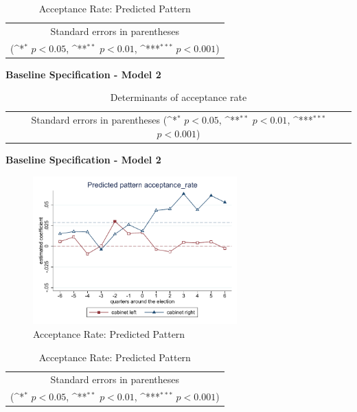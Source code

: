 \documentclass[10pt,a4paper]{scrartcl}
\begin{document}
\begin{table}[!ht]\centering
\renewcommand{\arraystretch}{1.25}
\def\sym#1{\ifmmode^{#1}\else\(^{#1}\)\fi}
\caption{Acceptance Rate: Predicted Pattern}
\begin{tabular}[]{l*{2}{c}}
	\hline\hline
	
	\hline\hline
	\multicolumn{3}{c}{\footnotesize Standard errors in parentheses} \\
	\multicolumn{3}{c}{\footnotesize (\sym{*} \(p<0.05\), \sym{**} \(p<0.01\), \sym{***} \(p<0.001\))}\\
\end{tabular}
\end{table}

\clearpage
\textbf{Baseline Specification - Model 2}
\begin{table}[!ht]\centering
	\scriptsize
	\renewcommand{\arraystretch}{1.05}
	\def\sym#1{\ifmmode^{#1}\else\(^{#1}\)\fi}
	\caption{Determinants of acceptance rate}
	\begin{tabular}{l*{3}{c}}
		\hline\hline
		
		\hline\hline
		\multicolumn{4}{c}{\footnotesize Standard errors in parentheses (\sym{*} \(p<0.05\), \sym{**} \(p<0.01\), \sym{***} \(p<0.001\))}\\
	\end{tabular}
\end{table}


\clearpage
\textbf{Baseline Specification - Model 2}
\begin{figure}[!ht]
	\centering
	\includegraphics[width=0.7\textwidth]{figures_edited/acceptance_rate_graph2_baseline.pdf}
	\caption{Acceptance Rate: Predicted Pattern}
\end{figure}

\begin{table}[!ht]\centering
	\footnotesize
	\renewcommand{\arraystretch}{1.2}
	\def\sym#1{\ifmmode^{#1}\else\(^{#1}\)\fi}
	\caption{Acceptance Rate: Predicted Pattern}
	\begin{tabular}{l*{2}{c}}
		\hline\hline
		
		\hline\hline
		\multicolumn{3}{c}{\footnotesize Standard errors in parentheses} \\
		\multicolumn{3}{c}{\footnotesize (\sym{*} \(p<0.05\), \sym{**} \(p<0.01\), \sym{***} \(p<0.001\))}\\
	\end{tabular}
\end{table}
\end{document}
